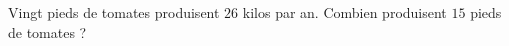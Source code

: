 
\begin{exercice}\label{exo2smath-0225}

    Vingt pieds de tomates produisent \( 26\) kilos par an. Combien produisent \( 15\) pieds de tomates ?

\end{exercice}
